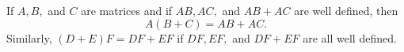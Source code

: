 If $A, B,$ and $C$ are matrices and if $AB, AC,$ and $AB + AC$ are well defined, then
$$A(B + C) = AB + AC.$$
Similarly, $(D + E)F = DF + EF$ if $DF, EF,$ and $DF + EF$ are all well defined.
